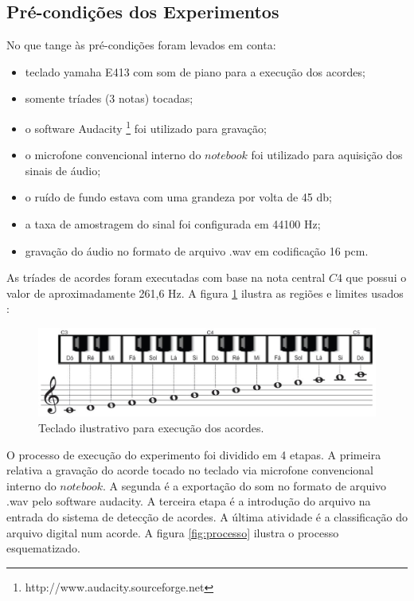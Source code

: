 \subsection{Pré-condições dos Experimentos}
\label{sec:precondicoes}

No que tange às pré-condições foram levados em conta:
\begin{itemize}
    \item teclado yamaha E413 com som de piano para a execução dos acordes;
    \item somente tríades (3 notas) tocadas;
    \item o software Audacity \footnote{http://www.audacity.sourceforge.net} foi utilizado para gravação;
    \item o microfone convencional interno do $notebook$ foi utilizado para aquisição dos sinais de áudio;
    \item o ruído de fundo estava com uma grandeza por volta de 45 db;
    \item a taxa de amostragem do sinal foi configurada em 44100 Hz;
    \item gravação do áudio no formato de arquivo .wav em codificação 16 pcm.
\end{itemize}


As tríades de acordes foram executadas com base na nota central $C4$ que possui o valor de aproximadamente 261,6 Hz. A figura \ref{fig:teclado} ilustra as regiões e limites usados \cite{teclado}:

\begin{figure}[h]
	\centering
		\includegraphics[keepaspectratio=true,scale=0.4]{figuras/teclado-tcc1.eps}
	\caption{Teclado ilustrativo para execução dos acordes.}
  \label{fig:teclado}
\end{figure}

O processo de execução do experimento foi dividido em 4 etapas. A primeira relativa a gravação do acorde tocado no teclado via microfone convencional interno do $notebook$. A segunda é a exportação do som no formato de arquivo .wav pelo software audacity. A terceira etapa é a introdução do arquivo na entrada do sistema de detecção de acordes. A última atividade é a classificação do arquivo digital num acorde. A figura \ref{fig:processo} ilustra o processo esquematizado.

